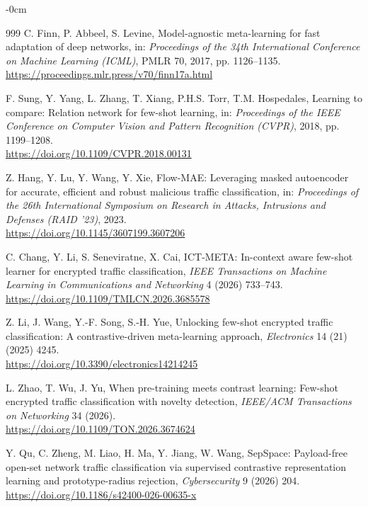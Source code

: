 \documentclass[sensors,article,submit,moreauthors]{Definitions/mdpi}
\begin{document}
\begin{adjustwidth}{-\extralength}{0cm}
\begin{thebibliography}{999}
C. Finn, P. Abbeel, S. Levine, Model-agnostic meta-learning for fast adaptation of deep networks, in: \textit{Proceedings of the 34th International Conference on Machine Learning (ICML)}, PMLR 70, 2017, pp. 1126--1135. \\
\url{https://proceedings.mlr.press/v70/finn17a.html}



F. Sung, Y. Yang, L. Zhang, T. Xiang, P.H.S. Torr, T.M. Hospedales, Learning to compare: Relation network for few-shot learning, in: \textit{Proceedings of the IEEE Conference on Computer Vision and Pattern Recognition (CVPR)}, 2018, pp. 1199--1208. \\
\url{https://doi.org/10.1109/CVPR.2018.00131}



Z. Hang, Y. Lu, Y. Wang, Y. Xie, Flow-MAE: Leveraging masked autoencoder for accurate, efficient and robust malicious traffic classification, in: \textit{Proceedings of the 26th International Symposium on Research in Attacks, Intrusions and Defenses (RAID '23)}, 2023. \\
\url{https://doi.org/10.1145/3607199.3607206}



C. Chang, Y. Li, S. Seneviratne, X. Cai, ICT-META: In-context aware few-shot learner for encrypted traffic classification, \textit{IEEE Transactions on Machine Learning in Communications and Networking} 4 (2026) 733--743. \\
\url{https://doi.org/10.1109/TMLCN.2026.3685578}



Z. Li, J. Wang, Y.-F. Song, S.-H. Yue, Unlocking few-shot encrypted traffic classification: A contrastive-driven meta-learning approach, \textit{Electronics} 14 (21) (2025) 4245. \\
\url{https://doi.org/10.3390/electronics14214245}



L. Zhao, T. Wu, J. Yu, When pre-training meets contrast learning: Few-shot encrypted traffic classification with novelty detection, \textit{IEEE/ACM Transactions on Networking} 34 (2026). \\
\url{https://doi.org/10.1109/TON.2026.3674624}



Y. Qu, C. Zheng, M. Liao, H. Ma, Y. Jiang, W. Wang, SepSpace: Payload-free open-set network traffic classification via supervised contrastive representation learning and prototype-radius rejection, \textit{Cybersecurity} 9 (2026) 204. \\
\url{https://doi.org/10.1186/s42400-026-00635-x}




\end{thebibliography}
\end{adjustwidth}
\end{document}
